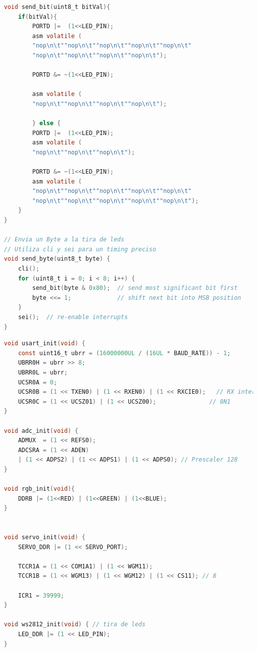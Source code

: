 \begin{lstlisting}[language=C, caption={Enviado de datos a tira LED}]
void send_bit(uint8_t bitVal){
	if(bitVal){
		PORTD |=  (1<<LED_PIN);
		asm volatile (
		"nop\n\t""nop\n\t""nop\n\t""nop\n\t""nop\n\t"
		"nop\n\t""nop\n\t""nop\n\t""nop\n\t");
		
		PORTD &= ~(1<<LED_PIN);
		
		asm volatile (
		"nop\n\t""nop\n\t""nop\n\t""nop\n\t");
		
		} else {
		PORTD |=  (1<<LED_PIN);
		asm volatile (
		"nop\n\t""nop\n\t""nop\n\t");
		
		PORTD &= ~(1<<LED_PIN);
		asm volatile (
		"nop\n\t""nop\n\t""nop\n\t""nop\n\t""nop\n\t"
		"nop\n\t""nop\n\t""nop\n\t""nop\n\t""nop\n\t");
	}
}

// Envia un Byte a la tira de leds
// Utiliza cli y sei para un timing preciso
void send_byte(uint8_t byte) {
	cli();  
	for (uint8_t i = 0; i < 8; i++) {
		send_bit(byte & 0x80);  // send most significant bit first
		byte <<= 1;             // shift next bit into MSB position
	}
	sei();  // re-enable interrupts
}
\end{lstlisting}

\begin{lstlisting}[language=C, caption={Inicializadores}]
void usart_init(void) {
	const uint16_t ubrr = (16000000UL / (16UL * BAUD_RATE)) - 1;
	UBRR0H = ubrr >> 8;
	UBRR0L = ubrr;
	UCSR0A = 0;
	UCSR0B = (1 << TXEN0) | (1 << RXEN0) | (1 << RXCIE0);   // RX interrupt
	UCSR0C = (1 << UCSZ01) | (1 << UCSZ00);               // 8N1
}

void adc_init(void) {
	ADMUX  = (1 << REFS0);                        
	ADCSRA = (1 << ADEN)                          
	| (1 << ADPS2) | (1 << ADPS1) | (1 << ADPS0); // Prescaler 128
}

void rgb_init(void){
	DDRB |= (1<<RED) | (1<<GREEN) | (1<<BLUE);
}


void servo_init(void) {
	SERVO_DDR |= (1 << SERVO_PORT); 

	TCCR1A = (1 << COM1A1) | (1 << WGM11);
	TCCR1B = (1 << WGM13) | (1 << WGM12) | (1 << CS11); // 8

	ICR1 = 39999;   
}
 
void ws2812_init(void) { // tira de leds
	LED_DDR |= (1 << LED_PIN);
}
\end{lstlisting}


